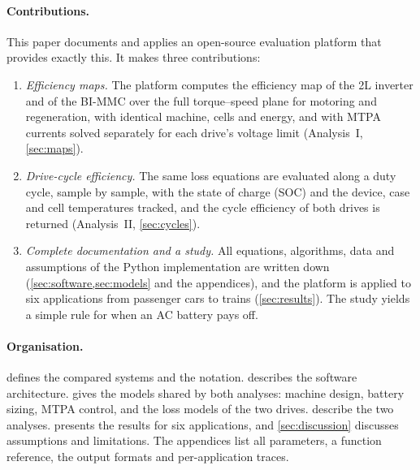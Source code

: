 \paragraph{Contributions.} This paper documents and applies an open-source evaluation platform that provides exactly this. It makes three contributions:
\begin{enumerate}
\item \emph{Efficiency maps.} The platform computes the efficiency map of the 2L inverter and of the BI-MMC over the full torque--speed plane for motoring and regeneration, with identical machine, cells and energy, and with MTPA currents solved separately for each drive's voltage limit (Analysis~I, \cref{sec:maps}).
\item \emph{Drive-cycle efficiency.} The same loss equations are evaluated along a duty cycle, sample by sample, with the state of charge (SOC) and the device, case and cell temperatures tracked, and the cycle efficiency of both drives is returned (Analysis~II, \cref{sec:cycles}).
\item \emph{Complete documentation and a study.} All equations, algorithms, data and assumptions of the Python implementation are written down (\cref{sec:software,sec:models} and the appendices), and the platform is applied to six applications from passenger cars to trains (\cref{sec:results}). The study yields a simple rule for when an AC battery pays off.
\end{enumerate}

\paragraph{Organisation.}  defines the compared systems and the notation.  describes the software architecture.  gives the models shared by both analyses: machine design, battery sizing, MTPA control, and the loss models of the two drives.  describe the two analyses.  presents the results for six applications, and \cref{sec:discussion} discusses assumptions and limitations. The appendices list all parameters, a function reference, the output formats and per-application traces.
